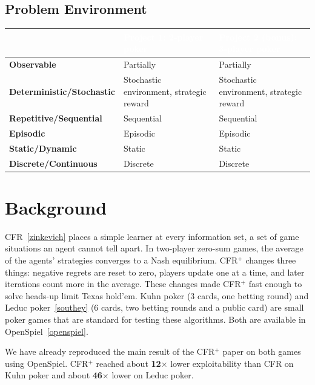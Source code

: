 \documentclass{article}
\newcommand{\citep}[1]{\ref{#1}}
\newcommand{\tablestyle}{\renewcommand{\arraystretch}{1.35}\rowcolors{2}{shallowBlue}{white}\arrayrulecolor{deepBlue}}
\newcommand{\headrow}{\rowcolor{deepBlue}}
\newcommand{\hd}[1]{\textcolor{white}{\textbf{#1}}}
\begin{document}
\subsection*{Problem Environment}
\begin{center}
\tablestyle
\begin{tabularx}{0.9\linewidth}{|>{\bfseries}l|X|X|}
\hline
\headrow & \hd{Project 1: 2-player poker} & \hd{Project 2 (bonus): 3-player poker} \\ \hline
Observable                 & Partially  & Partially \\ \hline
Deterministic/Stochastic   & Stochastic environment, strategic reward
                           & Stochastic environment, strategic reward \\ \hline
Repetitive/Sequential      & Sequential & Sequential \\ \hline
Episodic                   & Episodic   & Episodic \\ \hline
Static/Dynamic             & Static     & Static \\ \hline
Discrete/Continuous        & Discrete   & Discrete \\ \hline
\end{tabularx}
\end{center}

\section{Background}

CFR~\citep{zinkevich} places a simple learner at every information set, a set of game
situations an agent cannot tell apart. In two-player zero-sum games, the average of the agents'
strategies converges to a Nash equilibrium. CFR$^+$ changes three things: negative regrets are
reset to zero, players update one at a time, and later iterations count more in the average.
These changes made CFR$^+$ fast enough to solve heads-up limit Texas hold'em. Kuhn poker
(3 cards, one betting round) and Leduc poker~\citep{southey} (6 cards, two betting rounds and a
public card) are small poker games that are standard for testing these algorithms. Both are
available in OpenSpiel~\citep{openspiel}.

We have already reproduced the main result of the CFR$^+$ paper on both games using OpenSpiel.
CFR$^+$ reached about \textbf{12$\times$} lower exploitability than CFR on Kuhn poker and about
\textbf{46$\times$} lower on Leduc poker.
\end{document}
